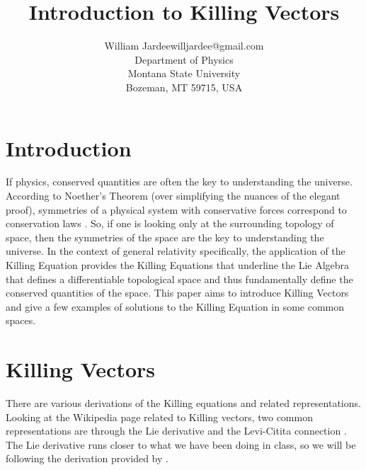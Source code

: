 \documentclass[11pt]{article}
\begin{document}
\title{Introduction to Killing Vectors}

\author{\name William Jardee\email willjardee@gmail.com \\
       \addr Department of Physics\\
       Montana State University\\
       Bozeman, MT 59715, USA
       }

\maketitle
 
\section{Introduction}
\label{sec:intro}
If physics, conserved quantities are often the key to understanding the universe. According to Noether's Theorem (over simplifying the nuances of the elegant proof), symmetries of a physical system with conservative forces correspond to conservation laws \citep{Noether_1971}. So, if one is looking only at the surrounding topology of space, then the symmetries of the space are the key to understanding the universe. In the context of general relativity specifically, the application of the Killing Equation provides the Killing Equations that underline the Lie Algebra that defines a differentiable topological space and thus fundamentally define the conserved quantities of the space. This paper aims to introduce Killing Vectors and give a few examples of solutions to the Killing Equation in some common spaces. 

\section{Killing Vectors}
There are various derivations of the Killing equations and related representations. Looking at the Wikipedia page related to Killing vectors, two common representations are through the Lie derivative and the Levi-Citita connection \citep{wiki}. The Lie derivative runs closer to what we have been doing in class, so we will be following the derivation provided by \cite{carroll2005spacetime}.
\end{document}
